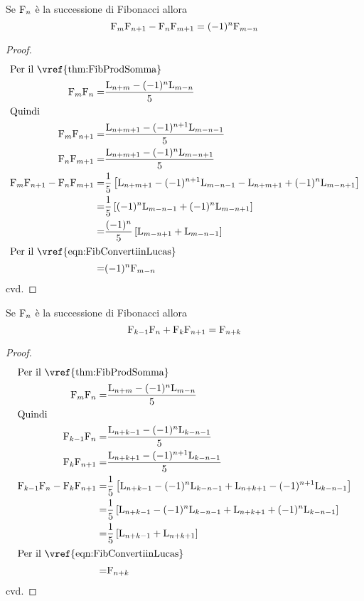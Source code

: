 \begin{thm}\label{thm:FibdOcagne}
	Se $\mathrm{F}_{n}$ è la successione di Fibonacci allora 
	\begin{equation}
		\mathrm{F}_{m}\mathrm{F}_{n+1}-\mathrm{F}_{n}\mathrm{F}_{m+1}=(-1)^n\mathrm{F}_{m-n}
	\end{equation}\label{eqn:FibdOcagne}
\end{thm}
\begin{proof}
\begin{align*}
	\intertext{Per il~\vref{thm:FibProdSomma}}
	\Fib{m}\Fib{n}=&{}\dfrac{\Luc{n+m}-(-1)^n\Luc{m-n}}{5}\\
	\intertext{Quindi}
		\Fib{m}\Fib{n+1}=&{}\dfrac{\Luc{n+m+1}-(-1)^{n+1}\Luc{m-n-1}}{5}\\
		\Fib{n}\Fib{m+1}=&{}\dfrac{\Luc{n+m+1}-(-1)^{n}\Luc{m-n+1}}{5}\\
		\Fib{m}\Fib{n+1}-\Fib{n}\Fib{m+1}
	=&{}{}\dfrac{1}{5}\left[\Luc{n+m+1}-(-1)^{n+1}\Luc{m-n-1}-\Luc{n+m+1}+(-1)^{n}\Luc{m-n+1}\right]\\
=&{}\dfrac{1}{5}\left[(-1)^{n}\Luc{m-n-1}+(-1)^{n}\Luc{m-n+1}\right]\\
=&{}\dfrac{(-1)^{n}}{5}\left[\Luc{m-n+1}+\Luc{m-n-1}\right]\\
\intertext{Per il~\vref{eqn:FibConvertiinLucas}}
=&{}(-1)^{n}\Fib{m-n}\\
\end{align*}
cvd.
\end{proof}
\begin{thm}\label{thm:FibHonsberger}
	Se $\mathrm{F}_{n}$ è la successione di Fibonacci allora 
	\begin{equation}
		\mathrm{F}_{k-1}\mathrm{F}_{n}+\mathrm{F}_{k}\mathrm{F}_{n+1}=\mathrm{F}_{n+k}
	\end{equation}\label{eqn:FibHonsberger}
\end{thm}
\begin{proof}
	\begin{align*}
		\intertext{Per il~\vref{thm:FibProdSomma}}
	\Fib{m}\Fib{n}=&{}\dfrac{\Luc{n+m}-(-1)^n\Luc{m-n}}{5}\\
	\intertext{Quindi}
	\Fib{k-1}\Fib{n}=&{}\dfrac{\Luc{n+k-1}-(-1)^n\Luc{k-n-1}}{5}\\
	\Fib{k}\Fib{n+1}=&{}\dfrac{\Luc{n+k+1}-(-1)^{n+1}\Luc{k-n-1}}{5}\\
	\Fib{k-1}\Fib{n}-\Fib{k}\Fib{n+1}=
	&\dfrac{1}{5}\left[\Luc{n+k-1}-(-1)^n\Luc{k-n-1}+\Luc{n+k+1}-(-1)^{n+1}\Luc{k-n-1}\right]\\
=&{}{}\dfrac{1}{5}\left[\Luc{n+k-1}-(-1)^n\Luc{k-n-1}+\Luc{n+k+1}+(-1)^{n}\Luc{k-n-1}\right]\\
=&{}{}\dfrac{1}{5}\left[\Luc{n+k-1}+\Luc{n+k+1}\right]\\
	\intertext{Per il~\vref{eqn:FibConvertiinLucas}}
=&{}{}\Fib{n+k}
	\end{align*}
cvd.
\end{proof}

